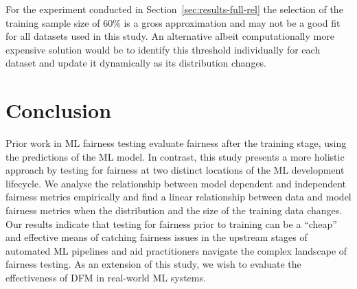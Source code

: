 \documentclass[sigconf,review,anonymous]{acmart}
\begin{document}

For the experiment conducted in Section \ref{sec:results-full-rel} the
selection of the training sample size of 60\% is a gross approximation
and may not be a good fit for all datasets used in this study. An
alternative albeit computationally more expensive solution would be to
identify this threshold individually for each dataset and update it
dynamically as its distribution changes.

\section{Conclusion}\label{sec:conclude}

Prior work in ML fairness testing evaluate fairness after the training
stage, using the predictions of the ML model. In contrast, this study
presents a more holistic approach by testing for fairness at two
distinct locations of the ML development lifecycle. We analyse the
relationship between model dependent and independent fairness metrics
empirically and find a linear relationship between data and model
fairness metrics when the distribution and the size of the training
data changes. Our results indicate that testing for fairness prior to
training can be a ``cheap'' and effective means of catching fairness
issues in the upstream stages of automated ML pipelines and aid
practitioners navigate the complex landscape of fairness testing. As
an extension of this study, we wish to evaluate the effectiveness of
DFM in real-world ML systems.



\end{document}
